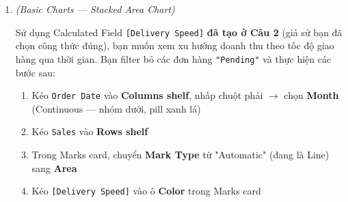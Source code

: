 \documentclass[12pt]{article}
\begin{document}
\begin{enumerate}[label=\textbf{Câu \arabic*.}, leftmargin=*, labelsep=1em, itemsep=2em]
\begin{guidelinebox}
\begin{itemize}
    \item \textbf{Choice (b) đúng:} Kiểm tra NULL \textbf{trước tiên} bằng \texttt{ISNULL([Ship Date])}. Nếu NULL $\rightarrow$ trả về \texttt{"Pending"} ngay, không tính DATEDIFF. Nếu Ship Date có giá trị $\rightarrow$ tiếp tục phân loại Fast/Normal/Slow. Thứ tự kiểm tra NULL trước là quan trọng vì IF/ELSEIF đánh giá \textbf{lần lượt từ trên xuống}.

    \item \textbf{Choice (c) sai:} Hai vấn đề:
    \begin{enumerate}[1.]
        \item \texttt{ZN(DATEDIFF(...))} khi Ship Date = NULL $\rightarrow$ DATEDIFF = NULL $\rightarrow$ ZN thay bằng 0 $\rightarrow$ \texttt{0 <= 2} = True $\rightarrow$ trả về \texttt{"Fast"}. Đơn hàng chưa giao bị phân loại sai thành \texttt{"Fast"}!
        \item \texttt{ISNULL} đặt \textbf{sau} 2 điều kiện DATEDIFF $\rightarrow$ không bao giờ được thực thi.
    \end{enumerate}

    \item \textbf{Choice (d) sai:} Khi Ship Date = NULL: \texttt{DATEDIFF} = NULL $\rightarrow$ \texttt{NULL <= 2} = NULL (falsy) $\rightarrow$ \texttt{NULL <= 5} = NULL (falsy) $\rightarrow$ rơi thẳng vào \textbf{ELSE} $\rightarrow$ \texttt{"Slow"}, bỏ qua \texttt{ISNULL}. Thứ tự sai --- ISNULL phải đứng \textbf{đầu tiên}.
\end{itemize}

\end{guidelinebox}

\newpage


\item \textit{(Basic Charts --- Stacked Area Chart)}

Sử dụng Calculated Field \texttt{[Delivery Speed]} \textbf{đã tạo ở Câu 2} (giả sử bạn đã chọn công thức đúng), bạn muốn xem xu hướng doanh thu theo tốc độ giao hàng qua thời gian. Bạn filter bỏ các đơn hàng \texttt{"Pending"} và thực hiện các bước sau:

\begin{enumerate}
    \item Kéo \texttt{Order Date} vào \textbf{Columns shelf}, nhấp chuột phải $\rightarrow$ chọn \textbf{Month} (Continuous --- nhóm dưới, pill xanh lá)
    \item Kéo \texttt{Sales} vào \textbf{Rows shelf}
    \item Trong Marks card, chuyển \textbf{Mark Type} từ "Automatic" (đang là Line) sang \textbf{Area}
    \item Kéo \texttt{[Delivery Speed]} vào ô \textbf{Color} trong Marks card
\end{enumerate}


\end{enumerate}
\end{document}
